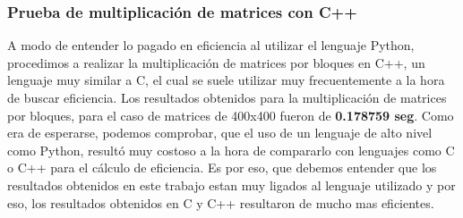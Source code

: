 \subsubsection{Prueba de multiplicación de matrices con C++}
    A modo de entender lo pagado en eficiencia al utilizar el lenguaje Python, 
    procedimos a realizar la multiplicación de matrices por bloques en C++, un lenguaje
    muy similar a C, el cual se suele utilizar muy frecuentemente a la hora de buscar
    eficiencia.
    Los resultados obtenidos para la multiplicación de matrices por bloques, para el caso
    de matrices de 400x400 fueron de \textbf{0.178759 seg}. Como era de esperarse, podemos 
    comprobar, que el uso de un lenguaje de alto nivel como Python, resultó muy costoso a
    la hora de compararlo con lenguajes como C o C++ para el cálculo de eficiencia.
    Es por eso, que debemos entender que los resultados obtenidos en este trabajo estan
    muy ligados al lenguaje utilizado y por eso, los resultados obtenidos en C y C++ resultaron
    de mucho mas eficientes.
